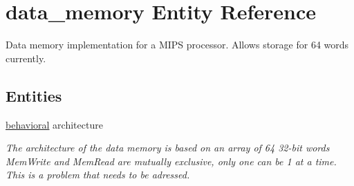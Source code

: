 \hypertarget{classdata__memory}{\section{data\-\_\-memory \-Entity \-Reference}
\label{classdata__memory}
}


\-Data memory implementation for a \-M\-I\-P\-S processor. \-Allows storage for 64 words currently.  


\subsection*{\-Entities}
\begin{DoxyCompactItemize}
\item 
\hyperlink{classdata__memory_1_1behavioral}{behavioral} architecture
\begin{DoxyCompactList}\small\item\em \-The architecture of the data memory is based on an array of 64 32-\/bit words  \-Mem\-Write and \-Mem\-Read are mutually exclusive, only one can be 1 at a time. \-This is a problem that needs to be adressed. \end{DoxyCompactList}\end{DoxyCompactItemize}
\*
\*
